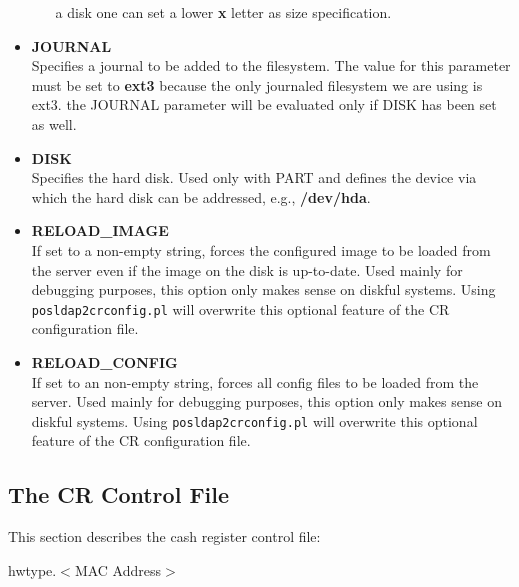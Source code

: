 \begin{itemize}
\begin{itemize}
                        a disk one can set a lower \textbf{x} letter as
                        size specification.
                  \end{itemize}
			\item \textbf{JOURNAL}\\
				  Specifies a journal to be added to the filesystem. The value
                  for this parameter must be set to \textbf{ext3} because the
                  only journaled filesystem we are using is ext3. the JOURNAL
				  parameter will be evaluated only if DISK has been set as well.
            \item \textbf{DISK}\\
                  Specifies the hard disk. Used only with PART and defines
                  the device via which the hard disk can be addressed,
                  e.g., \textbf{/dev/hda}.
                        \item \textbf{RELOAD\_IMAGE}\\
                  If set to a non-empty string, forces the configured
                  image to be loaded from the server even if the image on
                  the disk is up-to-date. Used mainly for debugging
                  purposes, this option only makes sense on diskful
                  systems. Using \texttt{posldap2crconfig.pl} will overwrite
				  this optional feature of the CR configuration file.
            \item \textbf{RELOAD\_CONFIG}\\
                  If set to an non-empty string, forces all config files
                  to be loaded from the server. Used mainly for debugging
                  purposes, this option only makes sense on diskful
                  systems.
				  Using \texttt{posldap2crconfig.pl} will overwrite
				  this optional feature of the CR configuration file.
\end{itemize}

\subsection{The CR Control File}
\label{section:cntrlhw}

This section describes the cash register control file:

\begin{Command}{8cm}
hwtype.$<$MAC Address$>$
\end{Command}

